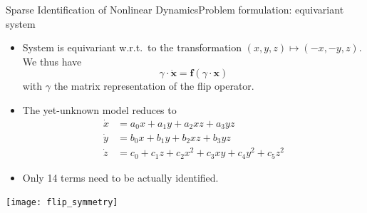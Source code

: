 \begin{frame}[t, c]{Sparse Identification of Nonlinear Dynamics}{Problem formulation: equivariant system}
  \begin{minipage}{.68\textwidth}
    \begin{itemize}
    \item System is equivariant w.r.t.\ to the transformation \( (x, y, z) \mapsto (-x, -y, z) \).
      We thus have
      \[
        \gamma \cdot \dot{\bm{x}} = \bm{f}\left( \gamma \cdot \bm{x} \right)
      \]
      with \( \gamma \) the matrix representation of the flip operator.
      
      \smallskip
      
    \item The yet-unknown model reduces to
      \[
        \begin{aligned}
          \dot{x} & = a_0 x + a_1 y + a_2 xz + a_3 yz \\
          \dot{y} & = b_0 x + b_1 y + b_2 xz + b_3 yz \\
          \dot{z} & = c_0 + c_1 z + c_2 x^2 + c_3 xy + c_4 y^2 + c_5 z^2
        \end{aligned}
      \]
      
      \smallskip
      
    \item Only 14 terms need to be actually identified.
      
    \end{itemize}
  \end{minipage}%
  \hfill
  \begin{minipage}{.28\textwidth}
    \centering
    \texttt{[image: flip\_symmetry]}
  \end{minipage}
  
  \vspace{1cm}
\end{frame}

